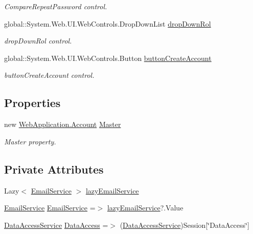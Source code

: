 \begin{DoxyCompactItemize}
\begin{DoxyCompactList}\small\item\em Compare\+Repeat\+Password control. \end{DoxyCompactList}\item 
global\+::\+System.\+Web.\+U\+I.\+Web\+Controls.\+Drop\+Down\+List \mbox{\hyperlink{classWebApplication_1_1Registro_a225d72ba4515f5fd01dc179e37ab2917}{drop\+Down\+Rol}}
\begin{DoxyCompactList}\small\item\em drop\+Down\+Rol control. \end{DoxyCompactList}\item 
global\+::\+System.\+Web.\+U\+I.\+Web\+Controls.\+Button \mbox{\hyperlink{classWebApplication_1_1Registro_a4ea48eccdd4cc7019bb93236cec4102f}{button\+Create\+Account}}
\begin{DoxyCompactList}\small\item\em button\+Create\+Account control. \end{DoxyCompactList}\end{DoxyCompactItemize}
\subsection*{Properties}
\begin{DoxyCompactItemize}
\item 
new \mbox{\hyperlink{classWebApplication_1_1Account}{Web\+Application.\+Account}} \mbox{\hyperlink{classWebApplication_1_1Registro_a91e9c41ae58c68f45906a1bc3cbeab8e}{Master}}
\begin{DoxyCompactList}\small\item\em Master property. \end{DoxyCompactList}\end{DoxyCompactItemize}
\subsection*{Private Attributes}
\begin{DoxyCompactItemize}
\item 
Lazy$<$ \mbox{\hyperlink{classEmailLib_1_1EmailService}{Email\+Service}} $>$ \mbox{\hyperlink{classWebApplication_1_1Registro_ab3596ca6d4c68364d6e109b9536b210a}{lazy\+Email\+Service}}
\item 
\mbox{\hyperlink{classEmailLib_1_1EmailService}{Email\+Service}} \mbox{\hyperlink{classWebApplication_1_1Registro_ab1c51ef2d472d1dd5d0118c1202fe320}{Email\+Service}} =$>$ \mbox{\hyperlink{classWebApplication_1_1Registro_ab3596ca6d4c68364d6e109b9536b210a}{lazy\+Email\+Service}}?.Value
\item 
\mbox{\hyperlink{classDataBaseAccess_1_1DataAccessService}{Data\+Access\+Service}} \mbox{\hyperlink{classWebApplication_1_1Registro_ae06e320e4cdfb04c4f2cdf542f13ef86}{Data\+Access}} =$>$ (\mbox{\hyperlink{classDataBaseAccess_1_1DataAccessService}{Data\+Access\+Service}})Session\mbox{[}\char`\"{}Data\+Access\char`\"{}\mbox{]}
\end{DoxyCompactItemize}


